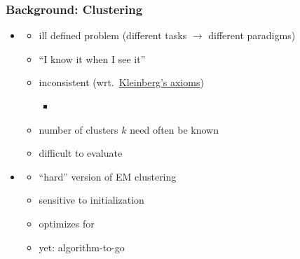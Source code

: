 \documentclass{beamer}
\begin{document}
\begin{frame}
\frametitle{Background: Clustering}

\begin{itemize}[<+-| alert@+>]\addtolength{\itemsep}{0.75\baselineskip}
\item {}
\begin{itemize}
\item ill defined problem (different tasks $\to$ different paradigms)
\item ``I know it when I see it''
\item inconsistent (wrt.~\href{https://www.cs.cornell.edu/home/kleinber/nips15.pdf}{\underline{Kleinberg's axioms}})
\begin{itemize}[<handout:0>]
\item {}
\end{itemize}
\item number of clusters $k$ need often be known
\item difficult to evaluate
\end{itemize}
\item {}
\begin{itemize}
\item ``hard'' version of EM clustering
\item sensitive to initialization
\item optimizes for 
\item yet: algorithm-to-go
\end{itemize}
\end{itemize}


\end{frame}

\MakeLastSlide
\end{document}
